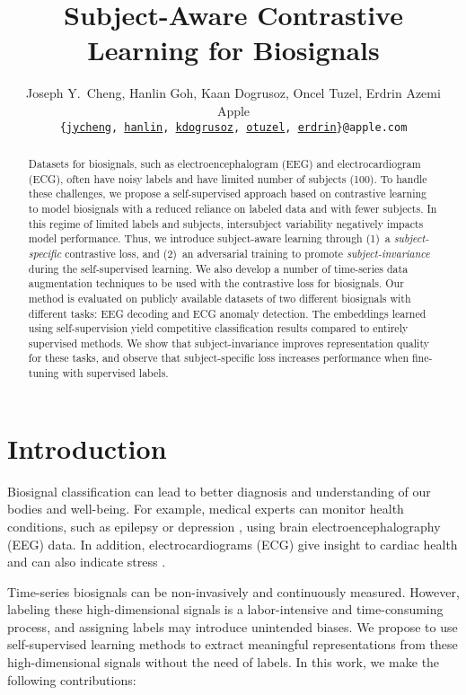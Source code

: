 \documentclass{article}
\title{Subject-Aware Contrastive Learning for Biosignals}
\author{Joseph Y.~Cheng, Hanlin Goh, Kaan Dogrusoz, Oncel Tuzel, Erdrin Azemi \\
  Apple \\
  \texttt{\{\href{mailto:jycheng@apple.com}{jycheng},\,\href{mailto:hanlin@apple.com}{hanlin},\,\href{mailto:kdogrusoz@apple.com}{kdogrusoz},\,\href{mailto:otuzel@apple.com}{otuzel},\,\href{mailto:erdrin@apple.com}{erdrin}\}@apple.com}
}
\begin{document}
\maketitle



\begin{abstract}
Datasets for biosignals, such as electroencephalogram (EEG) and electrocardiogram (ECG), often have noisy labels and have limited number of subjects (100). To handle these challenges, we propose a self-supervised approach based on contrastive learning to model biosignals with a reduced reliance on labeled data and with fewer subjects. In this regime of limited labels and subjects, intersubject variability negatively impacts model performance. Thus, we introduce subject-aware learning through (1)~a \textit{subject-specific} contrastive loss, and (2)~an adversarial training to promote \textit{subject-invariance} during the self-supervised learning. We also develop a number of time-series data augmentation techniques to be used with the contrastive loss for biosignals. Our method is evaluated on publicly available datasets of two different biosignals with different tasks: EEG decoding and ECG anomaly detection. The embeddings learned using self-supervision yield competitive classification results compared to entirely supervised methods. We show that subject-invariance improves representation quality for these tasks, and observe that subject-specific loss increases performance when fine-tuning with supervised labels.

\end{abstract} 

\section{Introduction}

Biosignal classification can lead to better diagnosis and understanding of our
bodies and well-being. For example, medical experts can monitor health
conditions, such as epilepsy \cite{acharya_automated_2013} or depression
\cite{de_aguiar_neto_depression_2019}, using brain electroencephalography (EEG)
data. In addition, electrocardiograms (ECG) give insight to cardiac health and
can also indicate stress \cite{healey_detecting_2005}.

Time-series biosignals can be non-invasively and continuously measured. However,
labeling these high-dimensional signals is a labor-intensive and time-consuming
process, and assigning labels may introduce unintended biases. We propose to use
self-supervised learning methods to extract meaningful representations from
these high-dimensional signals without the need of labels. In this work, we make the following contributions:
\end{document}
